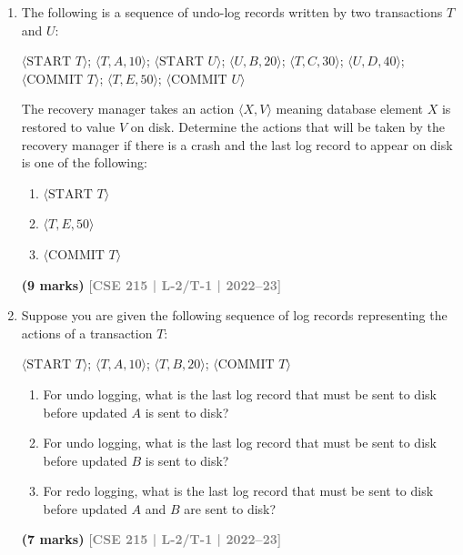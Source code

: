 \documentclass[12pt,a3paper]{article}
\newcommand{\yr}[1]{\hfill\textcolor{gray}{\small\textbf{[#1]}}}
\newcommand{\mk}[1]{\textcolor{orange!70!black}{\small\textbf{(#1 marks)}}}
\begin{document}
\begin{enumerate}
\item The following is a sequence of undo-log records written by two transactions $T$ and $U$:
\begin{center}
\small\ttfamily
$\langle\text{START } T\rangle$; $\langle T, A, 10\rangle$; $\langle\text{START } U\rangle$; $\langle U, B, 20\rangle$; $\langle T, C, 30\rangle$; $\langle U, D, 40\rangle$; $\langle\text{COMMIT } T\rangle$; $\langle T, E, 50\rangle$; $\langle\text{COMMIT } U\rangle$
\end{center}
The recovery manager takes an action $\langle X, V\rangle$ meaning database element $X$ is restored to value $V$ on disk. Determine the actions that will be taken by the recovery manager if there is a crash and the last log record to appear on disk is one of the following:
\begin{enumerate}
  \item $\langle\text{START } T\rangle$
  \item $\langle T, E, 50\rangle$
  \item $\langle\text{COMMIT } T\rangle$
\end{enumerate}
  \mk{9} \yr{CSE 215 | L-2/T-1 | 2022--23}

\item Suppose you are given the following sequence of log records representing the actions of a transaction $T$:
\begin{center}
\small\ttfamily
$\langle\text{START } T\rangle$; $\langle T, A, 10\rangle$; $\langle T, B, 20\rangle$; $\langle\text{COMMIT } T\rangle$
\end{center}
\begin{enumerate}
  \item For undo logging, what is the last log record that must be sent to disk before updated $A$ is sent to disk?
  \item For undo logging, what is the last log record that must be sent to disk before updated $B$ is sent to disk?
  \item For redo logging, what is the last log record that must be sent to disk before updated $A$ and $B$ are sent to disk?
\end{enumerate}
  \mk{7} \yr{CSE 215 | L-2/T-1 | 2022--23}


\end{enumerate}
\end{document}

